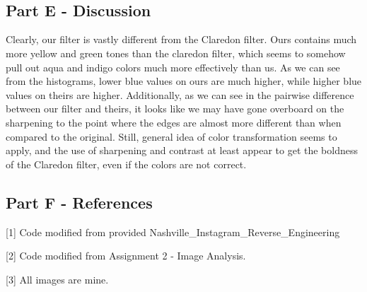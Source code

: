 \documentclass[11pt]{article}
\begin{document}
    \begin{center}
    \end{center}
    { \hspace*{\fill} \\}
    
    \begin{center}
    \end{center}
    { \hspace*{\fill} \\}
    
    \subsection{Part E - Discussion}\label{part-e---discussion}

    Clearly, our filter is vastly different from the Claredon filter. Ours
contains much more yellow and green tones than the claredon filter,
which seems to somehow pull out aqua and indigo colors much more
effectively than us. As we can see from the histograms, lower blue
values on ours are much higher, while higher blue values on theirs are
higher. Additionally, as we can see in the pairwise difference between
our filter and theirs, it looks like we may have gone overboard on the
sharpening to the point where the edges are almost more different than
when compared to the original. Still, general idea of color
transformation seems to apply, and the use of sharpening and contrast at
least appear to get the boldness of the Claredon filter, even if the
colors are not correct.

    \subsection{Part F - References}\label{part-f---references}

    {[}1{]} Code modified from provided
Nashville\_Instagram\_Reverse\_Engineering

    {[}2{]} Code modified from Assignment 2 - Image Analysis.

    {[}3{]} All images are mine.


    
    
    
    
\end{document}
